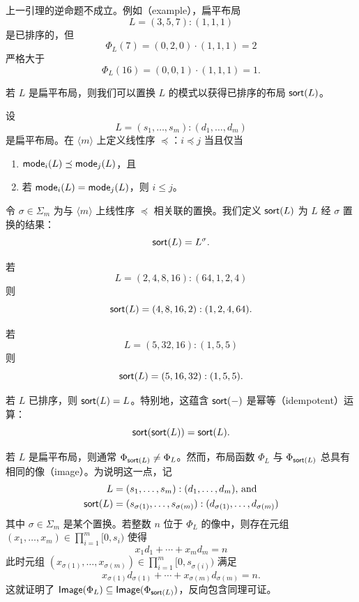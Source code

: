\begin{remark}
    上一引理的逆命题不成立。例如（example），扁平布局
    \[L = (3,5,7):(1,1,1)\]
    是已排序的，但
    \[
    \Phi_L(7) = (0,2,0) \cdot (1,1,1) = 2
    \]
    严格大于
    \[\Phi_L(16) = (0,0,1)\cdot(1,1,1) = 1.
    \]
\end{remark}

若 $L$ 是扁平布局，则我们可以置换 $L$ 的模式以获得已排序的布局 $\mathsf{sort}(L)$。

\begin{construction}
    设
    \[L = (s_1,\dots,s_m):(d_1,\dots,d_m)\]
    是扁平布局。在 $\langle m \rangle$ 上定义线性序 $\preceq$：$i \preceq j$ 当且仅当
    \begin{enumerate}
        \item $\mathsf{mode}_i(L) \preceq \mathsf{mode}_j(L)$，且
        \item 若 $\mathsf{mode}_i(L) = \mathsf{mode}_j(L)$，则 $i \leq j$。
    \end{enumerate}
    令 $\sigma \in \Sigma_m$ 为与 $\langle m \rangle$ 上线性序 $\preceq$ 相关联的置换。我们定义 $\mathsf{sort}(L)$ 为 $L$ 经 $\sigma$ 置换的结果：
    \[
    \mathsf{sort}(L) = L^\sigma.
    \]
\end{construction}

\begin{example}
    若
    \[L = (2,4,8,16):(64,1,2,4)\]
    则
    \[\mathsf{sort}(L) = (4,8,16,2):(1,2,4,64).\]
\end{example}
\begin{example}
若
\[L = (5,32,16):(1,5,5)\]
则
\[
    \mathsf{sort}(L) = (5,16,32):(1,5,5).
\]
\end{example}
\begin{example}
    若 $L$ 已排序，则 $\mathsf{sort}(L) = L$。特别地，这蕴含 $\mathsf{sort}(-)$ 是幂等（idempotent）运算：
    \[
    \mathsf{sort}(\mathsf{sort}(L)) = \mathsf{sort}(L).
    \]
\end{example}


\begin{observation}
    若 $L$ 是扁平布局，则通常 $\Phi_{\mathsf{sort}(L)} \neq \Phi_{L}$。然而，布局函数 $\Phi_L$ 与 $\Phi_{\mathsf{sort}(L)}$ 总具有相同的像（image）。为说明这一点，记
    \begin{align*} L & = (s_1,\dots,s_m):(d_1,\dots,d_m)\text{, and}\\
    \mathsf{sort}(L) & = (s_{\sigma(1)},\dots,s_{\sigma(m)}):(d_{\sigma(1)},\dots,d_{\sigma(m)})
    \end{align*}
    其中 $\sigma \in \Sigma_m$ 是某个置换。若整数 $n$ 位于 $\Phi_L$ 的像中，则存在元组 $(x_1,\dots,x_m) \in \prod_{i=1}^m {[}0,s_i{)}$ 使得
    \[
    x_1d_1 + \cdots + x_m d_m = n
    \]
    此时元组 $(x_{\sigma(1)},\dots,x_{\sigma(m)}) \in \prod_{i=1}^m {[}0,s_{\sigma(i)}{)}$ 满足
    \[
    x_{\sigma(1)}d_{\sigma(1)} + \cdots + x_{\sigma(m)}d_{\sigma(m)} = n.
    \]
    这就证明了 $\mathsf{Image}(\Phi_L) \subseteq \mathsf{Image}(\Phi_{\mathsf{sort}(L)})$，反向包含同理可证。
\end{observation}

